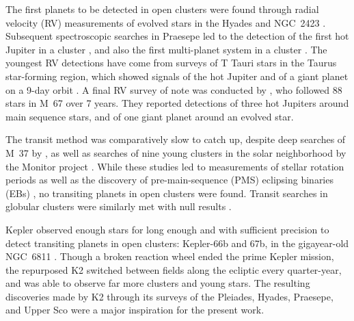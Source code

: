 \documentclass[12pt,twocolumn,tighten]{aastex62}
\begin{document}
The first planets to be detected in open clusters were found through
radial velocity (RV) measurements of evolved stars in the Hyades and
NGC~2423 \citep{Sato_et_al_2007,lovis_mayor_2007}.
Subsequent spectroscopic searches in Praesepe led to the detection of
the first hot Jupiter in a cluster \citep{Quinn_et_al_2012}, and also
the first multi-planet system in a cluster \citep{Malavolta_et_al_2016}.
The youngest RV detections have come from surveys of T Tauri stars in the
Taurus star-forming region, which showed signals of the hot Jupiter
\citep[V830~Tau~b][]{donati_hj_2016} and of a giant planet on a 9-day orbit
\citep[CI~Tau~b][]{johns-krull_candidate_2016,flagg_co_2019}.
A final RV survey of note was conducted by
\citet{brucalassi_search_2017}, who followed 88 stars in M~67 over 7
years.  They reported detections of three hot Jupiters around main
sequence stars, and of one giant planet around an evolved star.

The transit method was comparatively slow to catch up, despite deep
searches of M~37 by \citet{hartman_MMT_IV_2009}, as well as searches
of nine young clusters in the solar neighborhood by the Monitor
project
\citep{aigrain_monitor_2007,irwin_monitordata_2007,miller_monitor_2008}.
While these studies led to measurements of stellar rotation
periods \citep{hartman_rotation_2009,Irwin_NGC2516_2007} as well as
the discovery of pre-main-sequence (PMS) eclipsing binaries (EBs)
\citep{irwin_monitor_PMSEB_2007}, no transiting planets in open
clusters were found.  Transit searches in globular clusters were
similarly met with null results \citep{gilliland_lack_2000,
weldrake_searching_2006}.

Kepler \citep{borucki_kepler_2010} observed enough stars for long
enough and with sufficient precision to detect transiting planets in
open clusters:  Kepler-66b and 67b, in the gigayear-old NGC~6811
\citep{Meibom_et_al_2013}.  Though a broken reaction wheel ended the
prime Kepler mission, the repurposed K2 \citep{howell_k2_2014}
switched between fields along the ecliptic every quarter-year, and was
able to observe far more clusters and young stars.  The resulting
discoveries made by K2 through its surveys of the Pleiades, Hyades,
Praesepe, and Upper Sco were a major inspiration for the present work.
\end{document}
